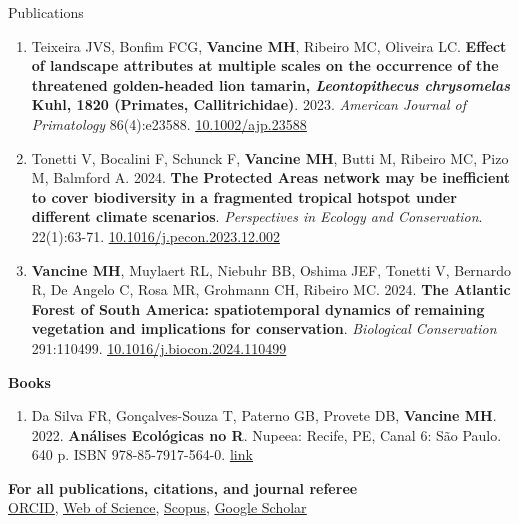 \documentclass{resume}
\begin{document}
\begin{rSection}{Publications}
\begin{enumerate}
\item Teixeira JVS, Bonfim FCG, {\bf Vancine MH}, Ribeiro MC, Oliveira LC. {\bf Effect of landscape attributes at multiple scales on the occurrence of the threatened golden-headed lion tamarin, \textbf{\textit{Leontopithecus chrysomelas}} Kuhl, 1820 (Primates, Callitrichidae)}. 2023. {\it American Journal of Primatology} 86(4):e23588. \href{https://doi.org/10.1002/ajp.23588}{\underline{10.1002/ajp.23588}}

\item Tonetti V, Bocalini F, Schunck F, {\bf Vancine MH}, Butti M, Ribeiro MC, Pizo M, Balmford A. 2024. {\bf The Protected Areas network may be inefficient to cover biodiversity in a fragmented tropical hotspot under different climate scenarios}. {\it Perspectives in Ecology and Conservation}. 22(1):63-71. \href{https://doi.org/10.1016/j.pecon.2023.12.002}{\underline{10.1016/j.pecon.2023.12.002}}

\item {\bf Vancine MH}, Muylaert RL, Niebuhr BB, Oshima JEF, Tonetti V, Bernardo R, De Angelo C, Rosa MR, Grohmann CH, Ribeiro MC. 2024. {\bf The Atlantic Forest of South America: spatiotemporal dynamics of remaining vegetation and implications for conservation}. {\it Biological Conservation} 291:110499. \href{https://doi.org/10.1016/j.biocon.2024.110499}{\underline{10.1016/j.biocon.2024.110499}}

\end{enumerate} 

{\bf Books}

\begin{enumerate} 
\item Da Silva FR, Gonçalves-Souza T, Paterno GB, Provete DB, {\bf Vancine MH}. 2022. {\bf Análises Ecológicas no R}. Nupeea: Recife, PE, Canal 6: São Paulo. 640 p. ISBN 978-85-7917-564-0. \href{https://analises-ecologicas.com/}{\underline{link}}
\end{enumerate} 

{\bf For all publications, citations, and journal referee}
\\\href{https://orcid.org/0000-0001-9650-7575}{\underline{ORCID}}, \href{https://www.webofscience.com/wos/author/record/837504}{\underline{Web of Science}}, \href{https://www.scopus.com/authid/detail.uri?authorId=57193451888}{\underline{Scopus}}, \href{https://scholar.google.com/citations?user=i-2xZBQAAAAJ}{\underline{Google Scholar}}

\end{rSection}
\end{document}

